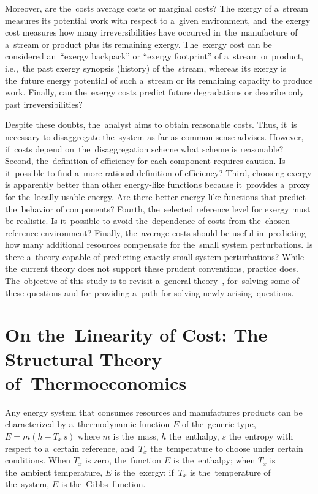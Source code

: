 \documentclass[energies,article,accept,moreauthors,pdftex]{Definitions/mdpi}
\begin{document}
Moreover, are the~costs average costs or marginal costs? The exergy of a~stream measures its potential work with respect to a~given environment, and~the exergy cost measures how many irreversibilities have occurred in~the~manufacture of a~stream or product plus its remaining exergy. The~exergy cost can be considered an~“exergy backpack” or “exergy footprint” of a~stream or product, i.e.,~the past exergy synopsis (history) of the~stream, whereas its exergy is the~future energy potential of such a~stream or its remaining capacity to produce work. Finally, can the~exergy costs predict future degradations or describe only past irreversibilities?

Despite these doubts, the~analyst aims to obtain reasonable costs. Thus, it~is necessary to disaggregate the~system as far as common sense advises. However, if~costs depend on~the~disaggregation scheme what scheme is reasonable? Second, the~definition of efficiency for each component requires caution. Is it~possible to find a~more rational definition of efficiency? Third, choosing exergy is apparently better than other energy-like functions because it~provides a~proxy for the~locally usable energy. Are there better energy-like functions that predict the~behavior of components? Fourth, the~selected reference level for exergy must be realistic. Is it~possible to avoid the~dependence of costs from the~chosen reference environment? Finally, the~average costs should be useful in~predicting how many additional resources compensate for the~small system perturbations. Is there a~theory capable of predicting  exactly small system perturbations? While the~current theory does not support these prudent conventions, practice does. The~objective of this study is to revisit a~general theory~\cite{Valero1992a,Valero1992b}, for~solving some of these questions and for providing a~path for solving newly arising~questions.

\section{On the~Linearity of Cost: The Structural Theory of~Thermoeconomics}
Any energy system that consumes resources and manufactures products can be characterized by a~thermodynamic function $E$ of the~generic type, $E = m (h-T_x\,s)$ where $m$ is the~mass, $h$ the~enthalpy, $s$ the~entropy with respect to a~certain reference, and~$T_x$ the~temperature to choose under certain conditions. When $T_x$ is zero, the~function $E$ is the~enthalpy; when $T_x$ is the~ambient temperature, $E$ is the~exergy; if~$T_x$ is the~temperature of the~system, $E$ is the~Gibbs~function.
\end{document}
